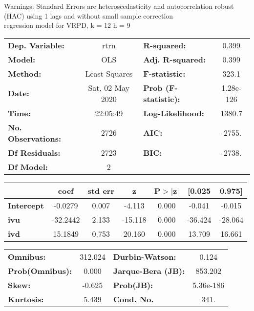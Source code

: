 Warnings: \newline
 [1] Standard Errors are heteroscedasticity and autocorrelation robust (HAC) using 1 lags and without small sample correction\\ 

regression model for VRPD, k = 12 h = 9\begin{center}
\begin{tabular}{lclc}
\toprule
\textbf{Dep. Variable:}    &       rtrn       & \textbf{  R-squared:         } &     0.399   \\
\textbf{Model:}            &       OLS        & \textbf{  Adj. R-squared:    } &     0.399   \\
\textbf{Method:}           &  Least Squares   & \textbf{  F-statistic:       } &     323.1   \\
\textbf{Date:}             & Sat, 02 May 2020 & \textbf{  Prob (F-statistic):} & 1.28e-126   \\
\textbf{Time:}             &     22:05:49     & \textbf{  Log-Likelihood:    } &    1380.7   \\
\textbf{No. Observations:} &        2726      & \textbf{  AIC:               } &    -2755.   \\
\textbf{Df Residuals:}     &        2723      & \textbf{  BIC:               } &    -2738.   \\
\textbf{Df Model:}         &           2      & \textbf{                     } &             \\
\bottomrule
\end{tabular}
\begin{tabular}{lcccccc}
                   & \textbf{coef} & \textbf{std err} & \textbf{z} & \textbf{P$> |$z$|$} & \textbf{[0.025} & \textbf{0.975]}  \\
\midrule
\textbf{Intercept} &      -0.0279  &        0.007     &    -4.113  &         0.000        &       -0.041    &       -0.015     \\
\textbf{ivu}       &     -32.2442  &        2.133     &   -15.118  &         0.000        &      -36.424    &      -28.064     \\
\textbf{ivd}       &      15.1849  &        0.753     &    20.160  &         0.000        &       13.709    &       16.661     \\
\bottomrule
\end{tabular}
\begin{tabular}{lclc}
\textbf{Omnibus:}       & 312.024 & \textbf{  Durbin-Watson:     } &     0.124  \\
\textbf{Prob(Omnibus):} &   0.000 & \textbf{  Jarque-Bera (JB):  } &   853.202  \\
\textbf{Skew:}          &  -0.625 & \textbf{  Prob(JB):          } & 5.36e-186  \\
\textbf{Kurtosis:}      &   5.439 & \textbf{  Cond. No.          } &      341.  \\
\bottomrule
\end{tabular}
\end{center}

